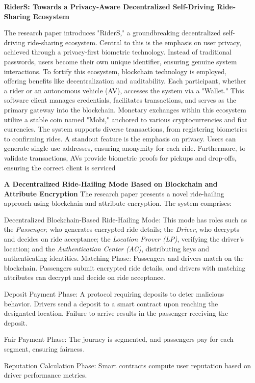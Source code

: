 \textbf{RiderS: Towards a Privacy-Aware Decentralized Self-Driving Ride-Sharing Ecosystem}

The research paper introduces "RiderS," a groundbreaking decentralized self-driving ride-sharing ecosystem. Central to this is the emphasis on user privacy, achieved through a privacy-first biometric technology. Instead of traditional passwords, users become their own unique identifier, ensuring genuine system interactions. To fortify this ecosystem, blockchain technology is employed, offering benefits like decentralization and auditability. Each participant, whether a rider or an autonomous vehicle (AV), accesses the system via a "Wallet." This software client manages credentials, facilitates transactions, and serves as the primary gateway into the blockchain. Monetary exchanges within this ecosystem utilize a stable coin named "Mobi," anchored to various cryptocurrencies and fiat currencies. The system supports diverse transactions, from registering biometrics to confirming rides. A standout feature is the emphasis on privacy. Users can generate single-use addresses, ensuring anonymity for each ride. Furthermore, to validate transactions, AVs provide biometric proofs for pickups and drop-offs, ensuring the correct client is serviced

\textbf{A Decentralized Ride-Hailing Mode Based on Blockchain and Attribute Encryption}
The research paper presents a novel ride-hailing approach using blockchain and attribute encryption. The system comprises:

Decentralized Blockchain-Based Ride-Hailing Mode: This mode has roles such as the \textit{Passenger}, who generates encrypted ride details; the \textit{Driver}, who decrypts and decides on ride acceptance; the \textit{Location Prover (LP)}, verifying the driver's location; and the \textit{Authentication Center (AC)}, distributing keys and authenticating identities.
Matching Phase: Passengers and drivers match on the blockchain. Passengers submit encrypted ride details, and drivers with matching attributes can decrypt and decide on ride acceptance.

Deposit Payment Phase: A protocol requiring deposits to deter malicious behavior. Drivers send a deposit to a smart contract upon reaching the designated location. Failure to arrive results in the passenger receiving the deposit.

Fair Payment Phase: The journey is segmented, and passengers pay for each segment, ensuring fairness.

Reputation Calculation Phase: Smart contracts compute user reputation based on driver performance metrics.

